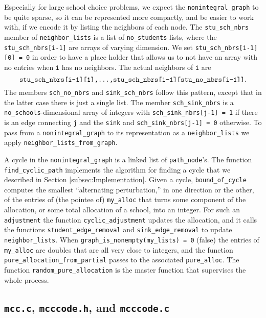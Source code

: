 \documentclass[12pt]{article}
\theoremstyle{definition}
\begin{document}
\begin{appendix}
Especially for large school choice problems, we expect the
\texttt{nonintegral\_graph} to be quite sparse, so it can be
represented more compactly, and be easier to work with, if we encode
it by listing the neighbors of each node.  The \texttt{stu\_sch\_nbrs}
member of \texttt{neighbor\_lists} is a list of \texttt{no\_students}
lists, where the \texttt{stu\_sch\_nbrs[i-1]} are arrays of varying
dimension. We set \texttt{stu\_sch\_nbrs[i-1][0] = 0} in order to have
a place holder that allows us to not have an array with no entries
when \texttt{i} has no neighbors.  The actual neighbors of \texttt{i}
are
$$\text{\texttt{stu\_sch\_nbrs[i-1][1],...,stu\_sch\_nbrs[i-1][stu\_no\_nbrs[i-1]]}}.$$
The members \texttt{sch\_no\_nbrs} and \texttt{sink\_sch\_nbrs} follow
this pattern, except that in the latter case there is just a single
list.  The member \texttt{sch\_sink\_nbrs} is a
\texttt{no\_schools}-dimensional array of integers with
\texttt{sch\_sink\_nbrs[j-1] = 1} if there is an edge connecting
\texttt{j} and the \texttt{sink} and \texttt{sch\_sink\_nbrs[j-1] = 0}
otherwise.  To pass from a \texttt{nonintegral\_graph} to its
representation as a \texttt{neighbor\_lists} we apply
\texttt{neighbor\_lists\_from\_graph}.

A cycle in the \texttt{nonintegral\_graph} is a linked list of
\texttt{path\_node}'s.  The function \texttt{find\_cyclic\_path}
implements the algorithm for finding a cycle that we described in
Section \ref{subsec:Implementation}.  Given a cycle,
\texttt{bound\_of\_cycle} computes the smallest ``alternating
perturbation,'' in one direction or the other, of the entries of (the
pointee of) \texttt{my\_alloc} that turns some component of the
allocation, or some total allocation of a school, into an integer.
For such an \texttt{adjustment} the function
\texttt{cyclic\_adjustment} updates the allocation, and it calls the
functions \texttt{student\_edge\_removal} and
\texttt{sink\_edge\_removal} to update \texttt{neighbor\_lists}.
When \texttt{graph\_is\_nonempty(my\_lists) = 0} (false) the entries
of \texttt{my\_alloc} are doubles that are all very close to integers,
and the function \texttt{pure\_allocation\_from\_partial} passes to
the associated \texttt{pure\_alloc}.  The function
\texttt{random\_pure\_allocation} is the master function that
supervises the whole process.

\subsection{\texttt{mcc.c}, \texttt{mcccode.h}, and \texttt{mcccode.c}}


\end{appendix}
\end{document}
